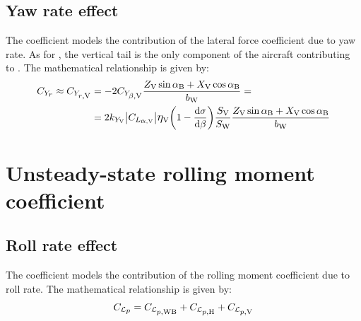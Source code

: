 \subsection{Yaw rate effect}
\label{subsec2.4.2}

The coefficient \CYrrate models the contribution of the lateral force coefficient due to yaw rate. As for \CYprate, the vertical tail is the only component of the aircraft contributing to \CYrrate. The mathematical relationship is given by:
\begin{equation}
\label{eq:sideforceyawrate}
\begin{split}
\CYrrate \approx \CYrrateV & = - 2 \CYbetaV \frac{\ZV\sin\alphaB + \XV \cos\alphaB}{\bW} = \\
& = 2 k_{Y_\textrm V} \big|\CLalphaV \big| \etaV \biggl( 1 - \frac{\mathrm{d}\sigma}{\mathrm{d}\beta} \biggr) \frac{\SV}{\SW} \frac{\ZV\sin\alphaB + \XV \cos\alphaB}{\bW}
\end{split}
\end{equation}

\section{Unsteady-state rolling moment coefficient}
\label{sec2.5}

\subsection{Roll rate effect}
\label{subsec2.5.1}

The coefficient \CLprate models the contribution of the rolling moment coefficient due to roll rate. The mathematical relationship is given by:
\begin{equation}
\label{eq:rollrollrate}
\CLprate = \CLprateWB + \CLprateH + \CLprateV
\end{equation}

